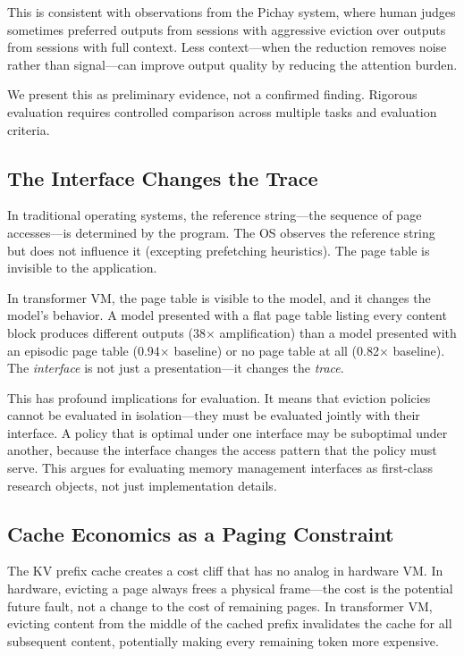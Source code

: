 \documentclass[sigplan,screen,anonymous]{acmart}
\begin{document}
This is consistent with observations from the Pichay system, where
human judges sometimes preferred outputs from sessions with aggressive
eviction over outputs from sessions with full context. Less
context---when the reduction removes noise rather than signal---can
improve output quality by reducing the attention burden.

We present this as preliminary evidence, not a confirmed finding.
Rigorous evaluation requires controlled comparison across multiple
tasks and evaluation criteria.

\subsection{The Interface Changes the Trace}
\label{sec:interface-trace}

In traditional operating systems, the reference string---the sequence
of page accesses---is determined by the program. The OS observes the
reference string but does not influence it (excepting prefetching
heuristics). The page table is invisible to the application.

In transformer VM, the page table is visible to the model, and it
changes the model's behavior. A model presented with a flat page
table listing every content block produces different outputs (38$\times$
amplification) than a model presented with an episodic page table
(0.94$\times$ baseline) or no page table at all (0.82$\times$
baseline). The \emph{interface} is not just a presentation---it
changes the \emph{trace}.

This has profound implications for evaluation. It means that eviction
policies cannot be evaluated in isolation---they must be evaluated
jointly with their interface. A policy that is optimal under one
interface may be suboptimal under another, because the interface
changes the access pattern that the policy must serve. This argues
for evaluating memory management interfaces as first-class research
objects, not just implementation details.

\subsection{Cache Economics as a Paging Constraint}

The KV prefix cache creates a cost cliff that has no analog in
hardware VM. In hardware, evicting a page always frees a physical
frame---the cost is the potential future fault, not a change to the
cost of remaining pages. In transformer VM, evicting content from the
middle of the cached prefix invalidates the cache for all subsequent
content, potentially making every remaining token more expensive.
\end{document}
